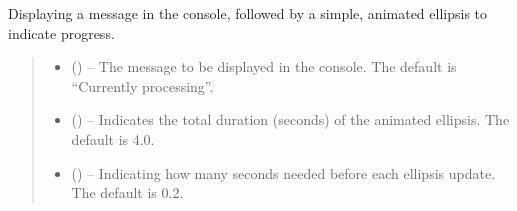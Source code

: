 \documentclass[letterpaper,10pt,english]{sphinxhowto}
\begin{document}
\begin{fulllineitems}
\label{\detokenize{_autosummary/custom_packages.misc_modules.styling_and_animations.print_animated_ellipsis_message:custom_packages.misc_modules.styling_and_animations.print_animated_ellipsis_message}}
\pysigstartsignatures
\pysiglinewithargsret
{}
{\sphinxparamcomma {}\sphinxparamcomma {}}
{}
\pysigstopsignatures
\sphinxAtStartPar
Displaying a message in the console, followed by a simple, animated ellipsis to indicate progress.
\begin{quote}\begin{description}
\begin{itemize}
\item {} 
\sphinxAtStartPar
{} (\sphinxstyleliteralemphasis{\sphinxupquote{, }}) – The message to be displayed in the console.
The default is “Currently processing”.

\item {} 
\sphinxAtStartPar
{} (\sphinxstyleliteralemphasis{\sphinxupquote{, }}) – Indicates the total duration (seconds) of the animated ellipsis.
The default is 4.0.

\item {} 
\sphinxAtStartPar
{} (\sphinxstyleliteralemphasis{\sphinxupquote{, }}) – Indicating how many seconds needed before each ellipsis update.
The default is 0.2.

\end{itemize}

\sphinxAtStartPar
{}

\end{description}\end{quote}

\end{fulllineitems}
\end{document}

